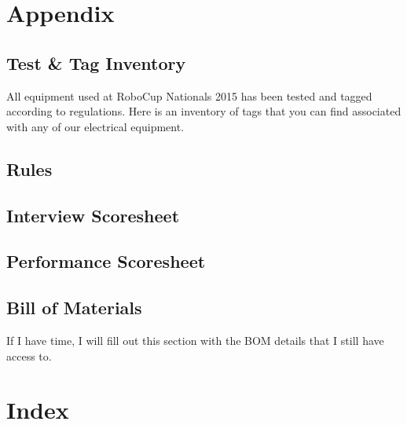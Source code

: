 \documentclass[12pt]{report}
\begin{document}
    
    
    \pagebreak
    
    
    \setcounter{page}{1}
    
        
    
    
    
    
    
    \part{Appendix}
    	\chapter{Test \& Tag Inventory}
        	All equipment used at RoboCup Nationals 2015 has been tested and tagged according to regulations. Here is an inventory of tags that you can find associated with any of our electrical equipment.\\
       	
       	\chapter{Rules}       	
       	
       	\chapter{Interview Scoresheet}
       	
       	\chapter{Performance Scoresheet}
       	
        	
            
		\chapter{Bill of Materials}
        	If I have time, I will fill out this section with the BOM details that I still have access to.\\
            
	\part{Index}            
    	\printindex    	        

\end{document}
